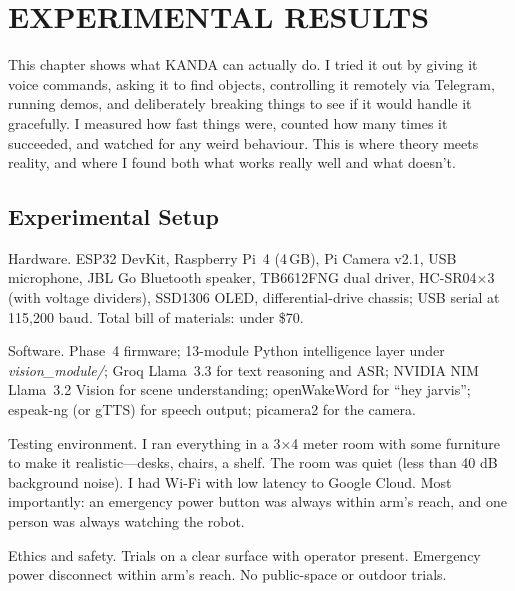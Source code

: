 \chapter{EXPERIMENTAL RESULTS}
\label{ch:results}

This chapter shows what KANDA can actually do. I tried it out by giving it voice commands, asking it to find objects, controlling it remotely via Telegram, running demos, and deliberately breaking things to see if it would handle it gracefully. I measured how fast things were, counted how many times it succeeded, and watched for any weird behaviour. This is where theory meets reality, and where I found both what works really well and what doesn't.

\section{Experimental Setup}
\label{sec:eval_setup}

Hardware. ESP32 DevKit, Raspberry Pi~4 (4\,GB), Pi Camera v2.1, USB microphone, JBL Go Bluetooth speaker, TB6612FNG dual driver, HC-SR04$\times$3 (with voltage dividers), SSD1306 OLED, differential-drive chassis; USB serial at 115,200 baud. Total bill of materials: under \$70.

Software. Phase~4 firmware; 13-module Python intelligence layer under \textit{vision\_module/}; Groq Llama~3.3 for text reasoning and ASR; NVIDIA NIM Llama~3.2 Vision for scene understanding; openWakeWord for ``hey jarvis''; espeak-ng (or gTTS) for speech output; picamera2 for the camera.

Testing environment. I ran everything in a 3×4 meter room with some furniture to make it realistic—desks, chairs, a shelf. The room was quiet (less than 40 dB background noise). I had Wi-Fi with low latency to Google Cloud. Most importantly: an emergency power button was always within arm's reach, and one person was always watching the robot.

Ethics and safety. Trials on a clear surface with operator present. Emergency power disconnect within arm's reach. No public-space or outdoor trials.

